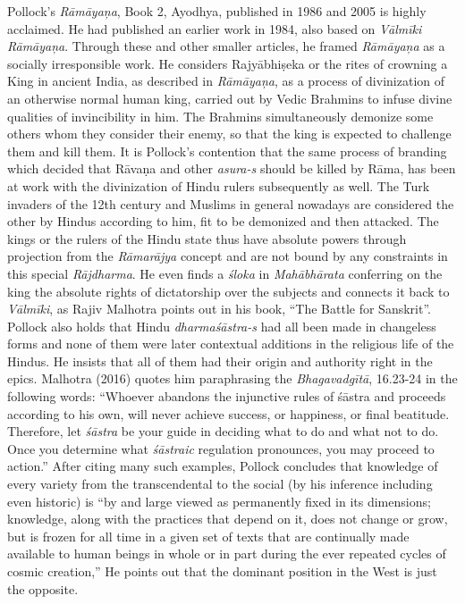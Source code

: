 \item Pollock’s \textit{Rāmāyaņa}, Book 2, Ayodhya, published in 1986 and 2005 is highly acclaimed. He had published an earlier work in 1984, also based on \textit{Vālmīki Rāmāyaņa}. Through these and other smaller articles, he framed \textit{Rāmāyaņa} as a socially irresponsible work. He considers Rajyābhiṣeka or the rites of crowning a King in ancient India, as described in \textit{Rāmāyaņa}, as a process of divinization of an otherwise normal human king, carried out by Vedic Brahmins to infuse divine qualities of invincibility in him. The Brahmins simultaneously demonize some others whom they consider their enemy, so that the king is expected to challenge them and kill them. It is Pollock’s contention that the same process of branding which decided that Rāvaṇa and other \textit{asura-s} should be killed by Rāma, has been at work with the divinization of Hindu rulers subsequently as well. The Turk invaders of the 12th century and Muslims in general nowadays are considered the other by Hindus according to him, fit to be demonized and then attacked. The kings or the rulers of the Hindu state thus have absolute powers through projection from the \textit{Rāmarājya} concept and are not bound by any constraints in this special \textit{Rājdharma}. He even finds a \textit{śloka} in \textit{Mahābhārata} conferring on the king the absolute rights of dictatorship over the subjects and connects it back to \textit{Vālmīki}, as Rajiv Malhotra points out in his book, “The Battle for Sanskrit”. Pollock also holds that Hindu \textit{dharmaśāstra-s} had all been made in changeless forms and none of them were later contextual additions in the religious life of the Hindus. He insists that all of them had their origin and authority right in the epics. Malhotra (2016) quotes him paraphrasing the \textit{Bhagavadgītā}, 16.23-24 in the following words: “Whoever abandons the injunctive rules of śāstra and proceeds according to his own, will never achieve success, or happiness, or final beatitude. Therefore, let \textit{śāstra} be your guide in deciding what to do and what not to do. Once you determine what \textit{śāstraic} regulation pronounces, you may proceed to action.” After citing many such examples, Pollock concludes that knowledge of every variety from the transcendental to the social (by his inference including even historic) is “by and large viewed as permanently fixed in its dimensions; knowledge, along with the practices that depend on it, does not change or grow, but is frozen for all time in a given set of texts that are continually made available to human beings in whole or in part during the ever repeated cycles of cosmic creation,” He points out that the dominant position in the West is just the opposite.

